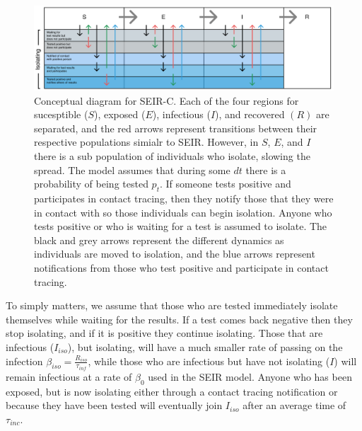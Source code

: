 \documentclass[notitlepage, superscriptaddress]{revtex4-2}
\begin{document}
\begin{figure}
\centering
\includegraphics[width=7in]{SEIR-C_diagram.png}
\caption{\label{f:SEIR-C}
 Conceptual diagram for SEIR-C. Each of the four regions for sucesptible ($S$), exposed ($E$), infectious ($I$), and recovered $(R)$ are separated, and the red arrows represent transitions between their respective populations simialr to SEIR. However, in $S$, $E$, and $I$ there is a sub population of individuals who isolate, slowing the spread. The model assumes that during some $dt$ there is a probability of being tested $p_t$. If someone tests positive and participates in contact tracing, then they notify those that they were in contact with so those individuals can begin isolation. Anyone who tests positive or who is waiting for a test is assumed to isolate.  The black and grey arrows represent the different dynamics as individuals are moved to isolation, and the blue arrows represent notifications from those who test positive and participate in contact tracing.}
\end{figure}

To simply matters, we assume that those who are tested immediately isolate themselves while waiting for the results. If a test comes back negative then they stop isolating, and if it is positive they continue isolating. Those that are infectious ($I_{iso}$), but isolating, will have a much smaller rate of passing on the infection $\beta_{iso} = \frac{R_{iso}}{\tau_{inf}}$, while those who are infectious but have not isolating ($I$) will remain infectious at a rate of $\beta_{0}$ used in the SEIR model. Anyone who has been exposed, but is now isolating either through a contact tracing notification or because they have been tested will eventually join $I_{iso}$ after an average time of $\tau_{inc}$. 
\end{document}
